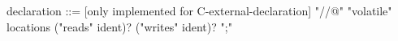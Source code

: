 \begin{syntax}
  declaration ::= {[only implemented for C-external-declaration] "//@" "volatile" locations ("reads" ident)? ("writes" ident)? ";"}
\end{syntax}

